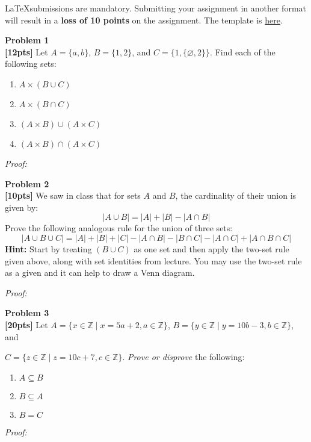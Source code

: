 \documentclass{article}
\newenvironment{problem}[2][Problem]
    { \begin{mdframed}[backgroundcolor=gray!20] \textbf{#1 #2} \\}
    {  \end{mdframed}}
\newenvironment{solution}
    {\textit{Proof:}}
    {}
\begin{document}
\begin{mdframed}[backgroundcolor=blue!20]
\LaTeX submissions are mandatory. Submitting your assignment in another format will result in a \textbf{loss of 10 points} on the assignment. The template is \href{https://www.overleaf.com/read/gzrhrggvggwb}{here}.
\end{mdframed}

\begin{problem}{1}
\textbf{[12pts]} Let $A=\{a,b\}$, $B=\{1,2\}$, and $C=\{1,\{\varnothing, 2\}\}$. Find each of the following sets:
\begin{enumerate}[label=(\alph*)]
    \item $A\times (B\cup C)$
    \item $A\times (B\cap C)$
    \item $(A\times B)\cup(A\times C)$
    \item $(A\times B)\cap(A\times C)$
\end{enumerate}
\end{problem}
\begin{solution}
\end{solution}

\begin{problem}{2}
\textbf{[10pts]} We saw in class that for sets $A$ and $B$, the cardinality of their union is given by:
$$ |A\cup B|=|A|+|B|-|A\cap B| $$
Prove the following analogous rule for the union of three sets:
$$ |A\cup B\cup C|=|A|+|B|+|C|-|A\cap B|-|B\cap C|-|A\cap C|+|A\cap B\cap C| $$
\textbf{Hint:} Start by treating $(B\cup C)$ as one set and then apply the two-set rule given above, along with set identities from lecture. You may use the two-set rule as a given and it can help to draw a Venn diagram.
\end{problem}
\begin{solution}
\end{solution}

\begin{problem}{3}
\textbf{[20pts]} Let $A=\{x\in\mathbb{Z}\mid x=5a+2, a\in\mathbb{Z}\}$, $B=\{y\in\mathbb{Z}\mid y=10b-3, b\in\mathbb{Z}\}$, and 

$C=\{z\in\mathbb{Z}\mid z=10c+7, c\in\mathbb{Z}\}$. \textit{Prove or disprove} the following:
\begin{enumerate}[label=(\alph*)]
    \item $A\subseteq B$
    \item $B\subseteq A$
    \item $B=C$
\end{enumerate}
\end{problem}
\begin{solution}
\end{solution}
\end{document}

